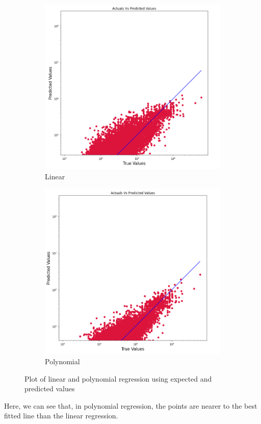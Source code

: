 \documentclass[conference]{IEEEtran}[10]
\begin{document}
\begin{figure}
     \centering
     \begin{subfigure}[b]{0.2\textwidth}
         \centering
         \includegraphics[width=\textwidth]{linear}
         \caption{Linear}
         \label{fig:Linear}
     \end{subfigure}
     \qquad
     \begin{subfigure}[b]{0.2\textwidth}
         \centering
         \includegraphics[width=\textwidth]{poly}
         \caption{Polynomial}
         \label{fig:Polynomial}
     \end{subfigure}
     
        \caption{Plot of linear and polynomial regression using expected and predicted values}
        \label{fig:Plot of linear and polynomial regression using expected and predicted values}
\end{figure}
Here, we can see that, in polynomial regression, the points are nearer to the best fitted line than the linear regression.
\end{document}
